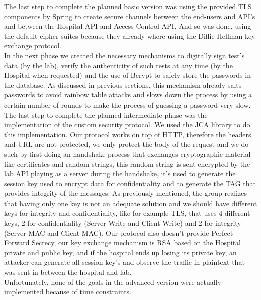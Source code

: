 The last step to complete the planned basic version was using the provided TLS components by Spring to create secure channels between the end-users and API's and between the Hospital API and Access Control API. And so was done, using the default cipher suites because they already where using the Diffie-Hellman key exchange protocol. \\

In the next phase we created the necessary mechanisms to digitally sign test's data (by the lab), verify the authenticity of such tests at any time (by the Hospital when requested) and the use of Bcrypt to safely store the passwords in the database. As discussed in previous sections, this mechanism already salts passwords to avoid rainbow table attacks and slows down the process by using a certain number of rounds to make the process of guessing a password very slow. \\

The last step to complete the planned intermediate phase was the implementation of the custom security protocol. We used the JCA library to do this implementation. Our protocol works on top of HTTP, therefore the headers and URL are not protected, we only protect the body of the request and we do such by first doing an handshake process that exchanges cryptographic material like certificates and random strings, this random string is sent encrypted by the lab API playing as a server during the handshake, it's used to generate the session key used to encrypt data for confidentiality and to generate the TAG that provides integrity of the messages. As previously mentioned, the group realizes that having only one key is not an adequate solution and we should have different keys for integrity and confidentiality, like for example TLS, that uses 4 different keys, 2 for confidentiality (Server-Write and Client-Write) and 2 for integrity (Server-MAC and Client-MAC). Our protocol also doesn't provide Perfect Forward Secrecy, our key exchange mechanism is RSA based on the Hospital private and public key, and if the hospital ends up losing its private key, an attacker can generate all session key's and observe the traffic in plaintext that was sent in between the hospital and lab. \\

Unfortunately, none of the goals in the advanced version were actually implemented because of time constraints. \\


